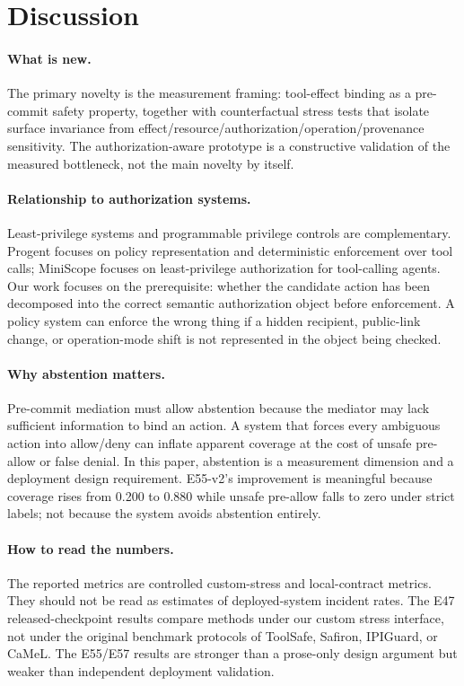 \section{Discussion}

\paragraph{What is new.}
The primary novelty is the measurement framing: tool-effect binding as a pre-commit safety property, together with counterfactual stress tests that isolate surface invariance from effect/resource/authorization/operation/provenance sensitivity. The authorization-aware prototype is a constructive validation of the measured bottleneck, not the main novelty by itself.

\paragraph{Relationship to authorization systems.}
Least-privilege systems and programmable privilege controls are complementary. Progent focuses on policy representation and deterministic enforcement over tool calls; MiniScope focuses on least-privilege authorization for tool-calling agents. Our work focuses on the prerequisite: whether the candidate action has been decomposed into the correct semantic authorization object before enforcement. A policy system can enforce the wrong thing if a hidden recipient, public-link change, or operation-mode shift is not represented in the object being checked.

\paragraph{Why abstention matters.}
Pre-commit mediation must allow abstention because the mediator may lack sufficient information to bind an action. A system that forces every ambiguous action into allow/deny can inflate apparent coverage at the cost of unsafe pre-allow or false denial. In this paper, abstention is a measurement dimension and a deployment design requirement. E55-v2's improvement is meaningful because coverage rises from 0.200 to 0.880 while unsafe pre-allow falls to zero under strict labels; not because the system avoids abstention entirely.

\paragraph{How to read the numbers.}
The reported metrics are controlled custom-stress and local-contract metrics. They should not be read as estimates of deployed-system incident rates. The E47 released-checkpoint results compare methods under our custom stress interface, not under the original benchmark protocols of ToolSafe, Safiron, IPIGuard, or CaMeL. The E55/E57 results are stronger than a prose-only design argument but weaker than independent deployment validation.
